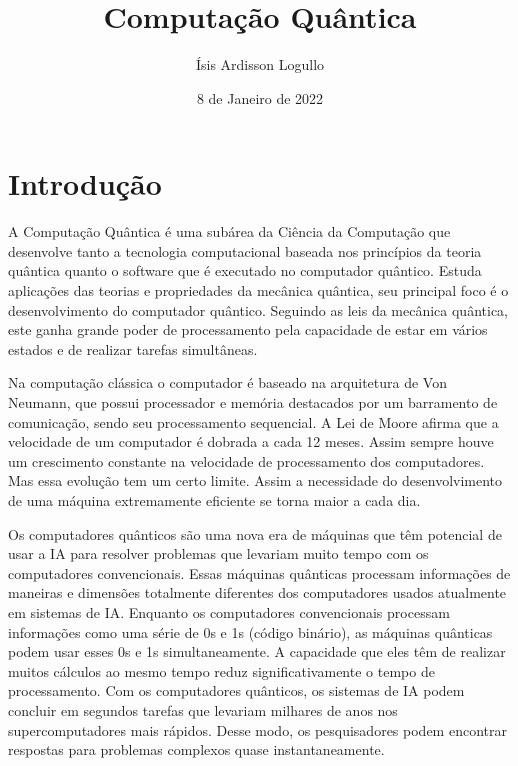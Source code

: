 \documentclass[12pt, a4paper, oneside]{article}
\title{Computação Quântica}
\author{Ísis Ardisson Logullo}
\date{8 de Janeiro de 2022}
\begin{document}
\maketitle


\section{Introdução}

\par A Computação Quântica é uma subárea da Ciência da Computação que desenvolve tanto a tecnologia computacional baseada nos princípios da teoria quântica quanto o software que é executado no computador quântico. Estuda aplicações das teorias e propriedades da mecânica quântica, seu principal foco é o desenvolvimento do computador quântico. Seguindo as leis da mecânica quântica, este ganha grande poder de processamento pela capacidade de estar em vários estados e de realizar tarefas simultâneas. 
\par Na computação clássica o computador é baseado na arquitetura de Von Neumann, que possui processador e memória destacados por um barramento de comunicação, sendo seu processamento sequencial. A Lei de Moore afirma que a velocidade de um computador é dobrada a cada 12 meses. Assim sempre houve um crescimento constante na velocidade de processamento dos computadores. Mas essa evolução tem um certo limite. Assim a necessidade do desenvolvimento de uma máquina extremamente eficiente se torna maior a cada dia.
\par Os computadores quânticos são uma nova era de máquinas que têm potencial de usar a IA para resolver problemas que levariam muito tempo com os computadores convencionais. Essas máquinas quânticas processam informações de maneiras e dimensões totalmente diferentes dos computadores usados atualmente em sistemas de IA. Enquanto os computadores convencionais processam informações como uma série de 0s e 1s (código binário), as máquinas quânticas podem usar esses 0s e 1s simultaneamente. A capacidade que eles têm de realizar muitos cálculos ao mesmo tempo reduz significativamente o tempo de processamento. Com os computadores quânticos, os sistemas de IA podem concluir em segundos tarefas que levariam milhares de anos nos supercomputadores mais rápidos. Desse modo, os pesquisadores podem encontrar respostas para problemas complexos quase instantaneamente.

\newpage

	
\end{document}
